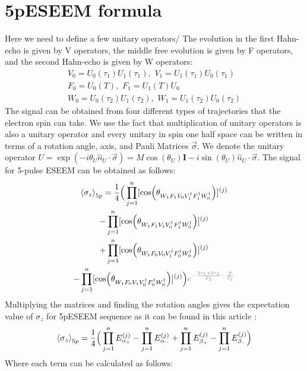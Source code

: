 \documentclass[%
 reprint,
superscriptaddress,
 amsmath,amssymb,
 aps,
]{revtex4-2}
\begin{document}
\appendix
\section{5pESEEM formula}
\label{app:5pESEEM}
Here we need to define a few unitary operators/ The evolution in the first Hahn-echo is given by V operators, the middle free evolution is given by F operators, and the second Hahn-echo is given by W operators:
\begin{gather}
	V_0 = U_0 (\tau_1) U_1 (\tau_1),\,\,  V_1 = U_1 (\tau_1) U_0 (\tau_1) \\
	F_0 = U_0 (T), \,\, F_1 = U_1 (T) U_0 \\
	W_0 = U_0 (\tau_2) U_1 (\tau_2), \,\, W_1 = U_1 (\tau_2) U_0 (\tau_2)
\end{gather}
The signal can be obtained from four different types of trajectories that the electron spin can take. We use the fact that multiplication of unitary operators is also a unitary operator and every unitary in spin one half space can be written in terms of a rotation angle, axis, and Pauli Matrices $\vec{\sigma}$. We denote the unitary operator $U = \exp(-i \theta_U \hat{n}_U\cdot\vec{\sigma}) = M\cos(\theta_U) \mathbf{I}- i \sin(\theta_U) \hat{n}_U\cdot\vec{\sigma}$. The signal for 5-pulse ESEEM can be obtained as follows:
\begin{gather}
		\expval{\sigma_z}_{5p} =\frac{1}{4}\Big( \prod_{j=1}^n [\cos(\theta_{W_1 F_1 V_0 V_1^\dagger F_1^\dagger W_0^\dagger})]^{(j)}  \notag \\
		-\prod_{j=1}^n [\cos(\theta_{W_1 F_1 V_1 V_0^\dagger F_1^\dagger W_0^\dagger})]^{(j)}  \notag \\
		+ \prod_{j=1}^n [\cos(\theta_{W_1 F_0 V_0 V_1^\dagger F_0^\dagger W_0^\dagger})]^{(j)}  \notag \\
		-\prod_{j=1}^n [\cos(\theta_{W_1 F_0 V_1 V_0^\dagger F_0^\dagger W_0^\dagger})]^{(j)} \Big) \textcolor{gray}{e^{-\frac{2\tau_1+2\tau_2}{T_2}- \frac{T}{T_1}}}
\end{gather}
Multiplying the matrices and finding the rotation angles gives the expectation value of $\sigma_z$ for 5pESEEM sequence as it can be found in this article \cite{kasumaj20085}:
\begin{gather}
	\expval{\sigma_z}_{5p} = \frac{1}{4}\Big( \prod_{j=1}^n E_{\alpha_+}^{(j)} - \prod_{j=1}^n E_{\alpha_-}^{(j)} + \prod_{j=1}^n E_{\beta_+}^{(j)}- \prod_{j=1}^n E_{\beta_-}^{(j)}\Big)
\end{gather}
Where each term can be calculated as follows:
\end{document}

